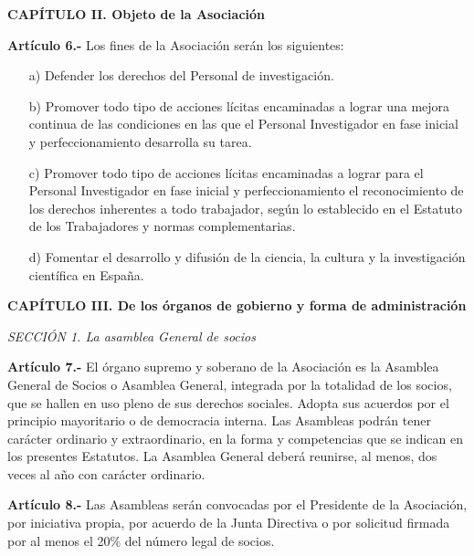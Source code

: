 \documentclass[a4paper,12pt]{article}
\begin{document}
\begin{onehalfspace}
\bigskip\bigskip

\begin{center}
\textbf{CAP\'ITULO II. Objeto de la Asociaci\'on}
\end{center}

\bigskip\bigskip

\textbf{Art\'iculo 6.-} Los fines de la Asociaci\'on ser\'an los siguientes:
\begin{itemize}
\item [a)] Defender los derechos del Personal de investigaci\'on.
\item [b)] Promover todo tipo de acciones l\'icitas encaminadas a lograr una mejora continua de las condiciones en las que el Personal Investigador en fase inicial y perfeccionamiento desarrolla su tarea.
\item [c)] Promover todo tipo de acciones l\'icitas encaminadas a lograr para el Personal Investigador en fase inicial y perfeccionamiento el reconocimiento de los derechos inherentes a todo trabajador, seg\'un lo establecido en el Estatuto de  los Trabajadores y normas complementarias.
\item [d)] Fomentar el desarrollo y difusi\'on de la ciencia, la cultura y la investigaci\'on cient\'ifica en Espa\~na.
\end{itemize}

\bigskip\bigskip
\begin{center}
\textbf{CAP\'ITULO III. De los \'organos de gobierno y forma de administraci\'on}
\end{center}

\bigskip\bigskip

\textit{SECCI\'ON 1\textordfeminine. La asamblea General de socios}

\bigskip\bigskip

\textbf{Art\'iculo 7.-} El \'organo supremo y soberano de la Asociaci\'on es la Asamblea General de Socios o Asamblea General, integrada por la totalidad de los socios, que se hallen en uso pleno de sus derechos sociales. Adopta sus acuerdos por el principio mayoritario o de democracia interna. Las Asambleas podr\'an tener car\'acter ordinario y extraordinario, en la forma y competencias que se indican en los presentes Estatutos. La Asamblea General deber\'a reunirse, al menos, dos veces al a\~no con car\'acter ordinario.

\bigskip\bigskip

\textbf{Art\'iculo 8.-} Las Asambleas ser\'an convocadas por el Presidente de la Asociaci\'on, por iniciativa propia, por acuerdo de la Junta Directiva o por solicitud firmada por al menos el 20\% del n\'umero legal de socios.


\end{onehalfspace}
\end{document}
